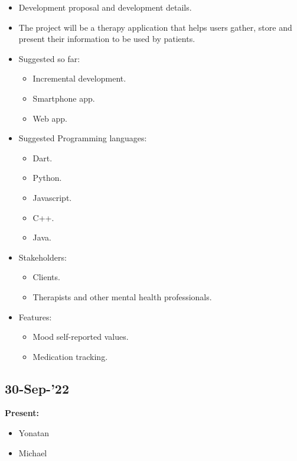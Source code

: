 \documentclass[11pt]{article}
\begin{document}
    \begin{itemize}
        \item  Development proposal and development details.
        \item  The project will be a therapy application that helps users gather, store and present their information to be used by patients.
        \item Suggested so far:
        \begin{itemize}
            \item Incremental development.
            \item Smartphone app.
            \item Web app.
        \end{itemize}
        \item  Suggested Programming languages:
        \begin{itemize}
            \item Dart.
            \item Python.
            \item Javascript.
            \item C++.
            \item Java.
        \end{itemize}
        \item Stakeholders:
        \begin{itemize}
            \item Clients.
            \item Therapists and other mental health professionals.
        \end{itemize}
        \item Features:
        \begin{itemize}
            \item Mood self-reported values.
            \item Medication tracking.
        \end{itemize}

    \end{itemize}

    \subsection{30-Sep-’22}\label{subsec:30-sep-22}

    \textbf{Present:}
    \begin{itemize}
        \item Yonatan
        \item Michael
    \end{itemize}
\end{document}
